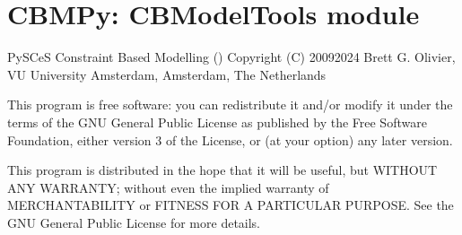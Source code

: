 \documentclass[letterpaper,10pt,english]{sphinxmanual}
\begin{document}
\begin{fulllineitems}

\begin{fulllineitems}
\label{\detokenize{modules_doc:cbmpy.CBModel.UserDefinedConstraint.getConstraintComponentVariables}}
\pysigstartsignatures
{}
\pysigstopsignatures
\end{fulllineitems}


\begin{fulllineitems}
\label{\detokenize{modules_doc:cbmpy.CBModel.UserDefinedConstraint.getConstraintComponents}}
\pysigstartsignatures
{}
\pysigstopsignatures
\end{fulllineitems}


\end{fulllineitems}

\label{\detokenize{modules_doc:module-cbmpy.CBModelTools}}

\section{CBMPy: CBModelTools module}
\label{\detokenize{modules_doc:cbmpy-cbmodeltools-module}}
\sphinxAtStartPar
PySCeS Constraint Based Modelling ()
Copyright (C) 2009\sphinxhyphen{}2024 Brett G. Olivier, VU University Amsterdam, Amsterdam, The Netherlands

\sphinxAtStartPar
This program is free software: you can redistribute it and/or modify
it under the terms of the GNU General Public License as published by
the Free Software Foundation, either version 3 of the License, or
(at your option) any later version.

\sphinxAtStartPar
This program is distributed in the hope that it will be useful,
but WITHOUT ANY WARRANTY; without even the implied warranty of
MERCHANTABILITY or FITNESS FOR A PARTICULAR PURPOSE.  See the
GNU General Public License for more details.
\end{document}
